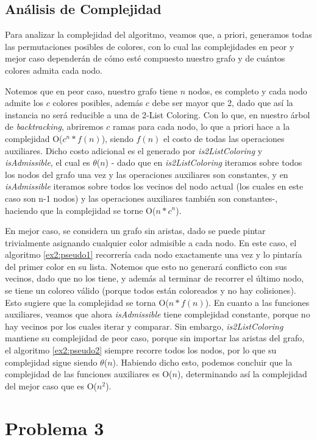 \documentclass{article}
\theoremstyle{definition}
\theoremstyle{remark}
\begin{document}
\subsection{Análisis de Complejidad}
Para analizar la complejidad del algoritmo, veamos que, a priori, generamos todas las permutaciones posibles de colores, con lo cual las complejidades en peor y mejor caso dependerán de cómo esté compuesto nuestro grafo y de cuántos colores admita cada nodo.

Notemos que en peor caso, nuestro grafo tiene $n$ nodos, es completo y cada nodo admite los $c$ colores posibles, además $c$ debe ser mayor que 2, dado que así la instancia no será reducible a una de 2-List Coloring. Con lo que, en nuestro árbol de \textit{backtracking}, abriremos $c$ ramas para cada nodo, lo que a priori hace a la complejidad O($c^{n}*f(n)$), siendo $f(n)$ el costo de todas las operaciones auxiliares. Dicho costo adicional es el generado por \textit{is2ListColoring} y \textit{isAdmissible}, el cual es $\theta$($n$) - dado que en \textit{is2ListColoring} iteramos sobre todos los nodos del grafo una vez y las operaciones auxiliares son constantes, y en \textit{isAdmissible} iteramos sobre todos los vecinos del nodo actual (los cuales en este caso son n-1 nodos) y las operaciones auxiliares también son constantes-, haciendo que la complejidad se torne O($n*c^{n}$).

En mejor caso, se considera un grafo sin aristas, dado se puede pintar trivialmente asignando cualquier color admisible a cada nodo. En este caso, el algoritmo \ref{ex2:pseudo1} recorrería cada nodo exactamente una vez y lo pintaría del primer color en su lista. Notemos que esto no generará conflicto con sus vecinos, dado que no los tiene, y además al terminar de recorrer el último nodo, se tiene un coloreo válido (porque todos están coloreados y no hay colisiones). Esto sugiere que la complejidad se torna O($n*f(n)$).
En cuanto a las funciones auxiliares, veamos que ahora \textit{isAdmissible} tiene complejidad constante, porque no hay vecinos por los cuales iterar y comparar. Sin embargo, \textit{is2ListColoring} mantiene su complejidad de peor caso, porque sin importar las aristas del grafo, el algoritmo \ref{ex2:pseudo2} siempre recorre todos los nodos, por lo que su complejidad sigue siendo $\theta$($n$). Habiendo dicho esto, podemos concluir que la complejidad de las funciones auxiliares es O($n$), determinando así la complejidad del mejor caso que es O($n^{2}$).

\section{Problema 3}
\end{document}
